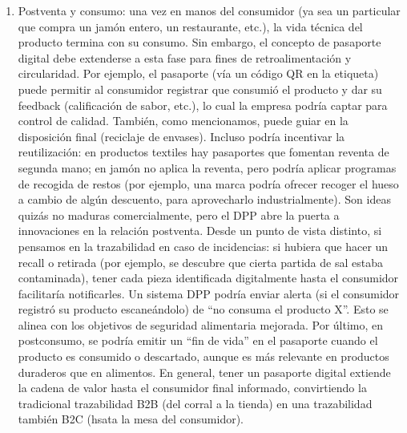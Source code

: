 \begin{enumerate}
    \item Postventa y consumo: una vez en manos del consumidor (ya sea un particular que compra un jamón entero, un restaurante, etc.), la vida técnica del producto termina con su consumo. Sin embargo, el concepto de pasaporte digital debe extenderse a esta fase para fines de retroalimentación y circularidad. Por ejemplo, el pasaporte (vía un código QR en la etiqueta) puede permitir al consumidor registrar que consumió el producto y dar su feedback (calificación de sabor, etc.), lo cual la empresa podría captar para control de calidad. También, como mencionamos, puede guiar en la disposición final (reciclaje de envases). Incluso podría incentivar la reutilización: en productos textiles hay pasaportes que fomentan reventa de segunda mano; en jamón no aplica la reventa, pero podría aplicar programas de recogida de restos (por ejemplo, una marca podría ofrecer recoger el hueso a cambio de algún descuento, para aprovecharlo industrialmente). Son ideas quizás no maduras comercialmente, pero el DPP abre la puerta a innovaciones en la relación postventa. Desde un punto de vista distinto, si pensamos en la trazabilidad en caso de incidencias: si hubiera que hacer un recall o retirada (por ejemplo, se descubre que cierta partida de sal estaba contaminada), tener cada pieza identificada digitalmente hasta el consumidor facilitaría notificarles. Un sistema DPP podría enviar alerta (si el consumidor registró su producto escaneándolo) de “no consuma el producto X”. Esto se alinea con los objetivos de seguridad alimentaria mejorada. Por último, en postconsumo, se podría emitir un “fin de vida” en el pasaporte cuando el producto es consumido o descartado, aunque es más relevante en productos duraderos que en alimentos. En general, tener un pasaporte digital extiende la cadena de valor hasta el consumidor final informado, convirtiendo la tradicional trazabilidad B2B (del corral a la tienda) en una trazabilidad también B2C (hsata la mesa del consumidor).
\end{enumerate}

